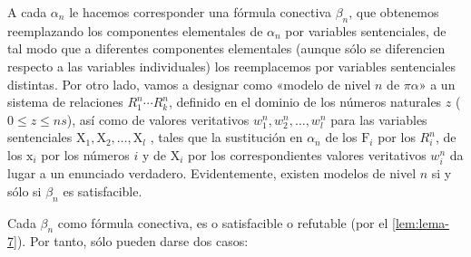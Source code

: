 A cada $\alpha_n$ le hacemos corresponder una fórmula conectiva $\beta_n$, que obtenemos reemplazando los componentes elementales de $\alpha_n$ por variables sentenciales, 
de tal modo que a diferentes componentes elementales (aunque sólo se diferencien respecto a las variables individuales) los reemplacemos por variables sentenciales distintas. 
Por otro lado, vamos a designar como
«modelo de nivel $n$ de $\pi\alpha$» a un sistema de relaciones $R_1^n \cdots R_k^n$, definido en el dominio de los números naturales $z$ ($0 \leq z \leq ns$), así como de valores
veritativos $w_1^n, w_2^n, \dots, w_l^n$ para las variables sentenciales $\text{X}_1, \text{X}_2, \dots, \text{X}_l$ , tales que la sustitución en $\alpha_n$ de los $\text{F}_i$ 
por los $R_i^n$, de los $\text{x}_i$ por los números $i$ y de $\text{X}_i$ por los correspondientes valores veritativos $w_i^n$ da lugar a un enunciado verdadero. Evidentemente,
existen modelos de nivel $n$ si y sólo si $\beta_n$ es satisfacible.

Cada $\beta_n$ como fórmula conectiva, es o satisfacible o refutable (por el \autoref{lem:lema-7}). Por tanto, sólo pueden darse dos casos:

